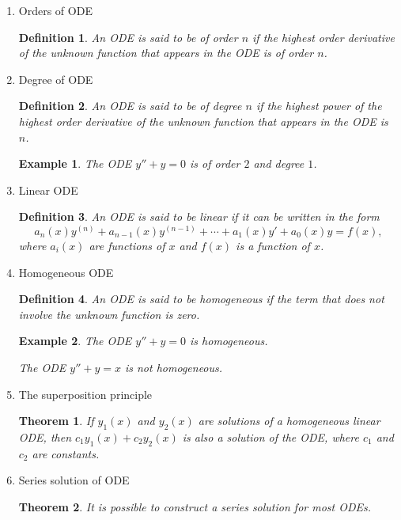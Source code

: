 \documentclass{article}
\newtheorem{definition}{Definition}[section]
\newtheorem{theorem}{Theorem}[section]
\newtheorem{example}{Example}[section]
\begin{document}
\begin{enumerate}
    \item Orders of ODE
          \begin{definition}
              An ODE is said to be of order $n$ if the highest order
              derivative of the unknown function
              that appears in the ODE is of order $n$.
          \end{definition}
    \item Degree of ODE
          \begin{definition}
              An ODE is said to be of degree $n$ if the highest power
              of the highest order derivative of the unknown function
              that appears in the ODE is $n$.
          \end{definition}
          \begin{example}
              The ODE $y'' + y = 0$ is of order $2$ and degree $1$.
          \end{example}
    \item Linear ODE
          \begin{definition}
              An ODE is said to be linear if it can be written in the form
              \begin{equation}
                  a_n(x) y^{(n)} + a_{n-1}(x) y^{(n-1)} + \cdots + a_1(x) y' + a_0(x) y = f(x),
              \end{equation}
              where $a_i(x)$ are functions of $x$ and $f(x)$ is a function of $x$.
          \end{definition}
    \item Homogeneous ODE
          \begin{definition}
              An ODE is said to be homogeneous
              if the term that does not involve the unknown function
              is zero.
          \end{definition}
          \begin{example}
              The ODE $y'' + y = 0$ is homogeneous.

              The ODE $y'' + y = x$ is not homogeneous.
          \end{example}
    \item The superposition principle
          \begin{theorem}
              If $y_1(x)$ and $y_2(x)$ are solutions of a homogeneous linear ODE,
              then $c_1 y_1(x) + c_2 y_2(x)$ is also a solution of the ODE,
              where $c_1$ and $c_2$ are constants.
          \end{theorem}
    \item Series solution of ODE
          \begin{theorem}
              It is possible to construct a series solution for most ODEs.


\end{theorem}
\end{enumerate}
\end{document}
